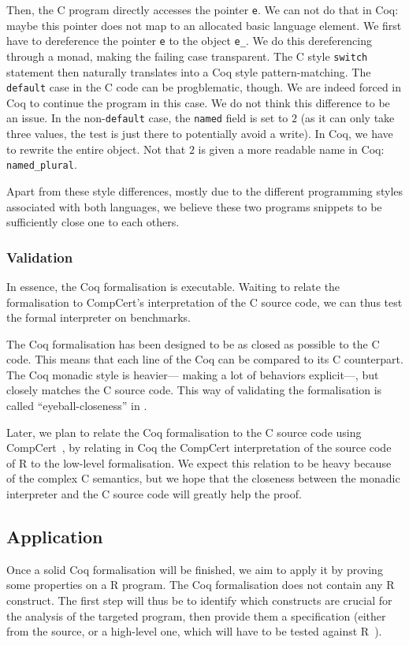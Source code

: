 \documentclass{article}
\newcommand\Coq{Coq}
\newcommand\R{R}
\newcommand\Cn{C}
\begin{document}
Then, the \Cn{} program directly accesses the pointer \texttt{e}.
We can not do that in \Coq{}:
maybe this pointer does not map to an allocated basic language element.
We first have to dereference the pointer \texttt{e}
to the object \texttt{e_}.
We do this dereferencing through a monad,
making the failing case transparent.
The \Cn{} style \texttt{switch} statement then naturally translates
into a \Coq{} style pattern-matching.
The \texttt{default} case in the \Cn{} code can be progblematic, though.
We are indeed forced in \Coq{} to continue the program in this case.
We do not think this difference to be an issue.
In the non-\texttt{default} case,
the \texttt{named} field is set to \(2\)
(as it can only take three values, the test is just there to potentially avoid a write).
In \Coq{}, we have to rewrite the entire object.
Not that \(2\) is given a more readable name in \Coq{}:
\texttt{named_plural}.

Apart from these style differences,
mostly due to the different programming styles associated with both languages,
we believe these two programs snippets to be sufficiently close one to each others.


\subsubsection{Validation}

In essence, the \Coq{} formalisation is executable.
Waiting to relate the formalisation to CompCert’s interpretation
of the \Cn{} source code, we can thus test the formal interpreter
on benchmarks.

The \Coq{} formalisation has been designed to be as closed as
possible to the \Cn{} code.
This means that each line of the \Coq{} can be compared to its
\Cn{} counterpart.
The \Coq{} monadic style is heavier—%
making a lot of behaviors explicit—,
but closely matches the \Cn{} source code.
This way of validating the formalisation is called “eyeball-closeness”
in \cite{bodin2014trusted}.

Later, we plan to relate the \Coq{} formalisation
to the \Cn{} source code using CompCert~\parencite{Leroy-Compcert-CACM},
by relating in \Coq{} the CompCert interpretation of the source code of \R{}
to the low-level formalisation.
We expect this relation to be heavy because of the complex \Cn{} semantics,
but we hope that the closeness between the monadic interpreter and the \Cn{}
source code will greatly help the proof.


\subsection{Application}

Once a solid \Coq{} formalisation will be finished,
we aim to apply it by proving some properties on a \R{} program.
%
The \Coq{} formalisation does not contain any \R{} construct.
The first step will thus be to identify which constructs
are crucial for the analysis of the targeted program,
then provide them a specification
(either from the source, or a high-level one, which will have
to be tested against \R{}~\parencite{maj2013testr}).


\printbibliography
\end{document}
